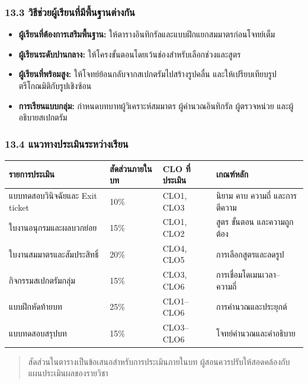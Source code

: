 \subsubsection{13.3 วิธีช่วยผู้เรียนที่มีพื้นฐานต่างกัน}

\begin{itemize}
\item
  \textbf{ผู้เรียนที่ต้องการเสริมพื้นฐาน:} ให้ตารางอินทิกรัลและแบบฝึกแยกสมมาตรก่อนโจทย์เต็ม
\item
  \textbf{ผู้เรียนระดับปานกลาง:} ให้โครงขั้นตอนโดยเว้นช่องสำหรับเลือกช่วงและสูตร
\item
  \textbf{ผู้เรียนที่พร้อมสูง:} ให้โจทย์ย้อนกลับจากสเปกตรัมไปสร้างรูปคลื่น และให้เปรียบเทียบรูปตรีโกณมิติกับรูปเชิงซ้อน
\item
  \textbf{การเรียนแบบกลุ่ม:} กำหนดบทบาทผู้วิเคราะห์สมมาตร ผู้คำนวณอินทิกรัล ผู้ตรวจหน่วย และผู้อธิบายสเปกตรัม
\end{itemize}

\subsubsection{13.4 แนวทางประเมินระหว่างเรียน}

\begin{table}[htbp]
    \centering
    \begin{tabularx}{\textwidth}{Y L{0.13\textwidth} L{0.17\textwidth} Y}
        \hline
        \textbf{รายการประเมิน} & \textbf{สัดส่วนภายในบท} & \textbf{CLO ที่ประเมิน} & \textbf{เกณฑ์หลัก} \\
        \hline
        แบบทดสอบวินิจฉัยและ Exit ticket & 10\% & CLO1, CLO3 & นิยาม คาบ ความถี่ และการตีความ \\
        ใบงานอนุกรมและผลบวกย่อย & 15\% & CLO1, CLO2 & สูตร ขั้นตอน และความถูกต้อง \\
        ใบงานสมมาตรและสัมประสิทธิ์ & 20\% & CLO4, CLO5 & การเลือกสูตรและลดรูป \\
        กิจกรรมสเปกตรัมกลุ่ม & 15\% & CLO3, CLO6 & การเชื่อมโดเมนเวลา--ความถี่ \\
        แบบฝึกหัดท้ายบท & 25\% & CLO1--CLO6 & การคำนวณและประยุกต์ \\
        แบบทดสอบสรุปบท & 15\% & CLO3--CLO6 & โจทย์คำนวณและคำอธิบาย \\
        \hline
    \end{tabularx}
\end{table}

\begin{quote}
สัดส่วนในตารางเป็นข้อเสนอสำหรับการประเมินภายในบท ผู้สอนควรปรับให้สอดคล้องกับแผนประเมินผลของรายวิชา
\end{quote}

